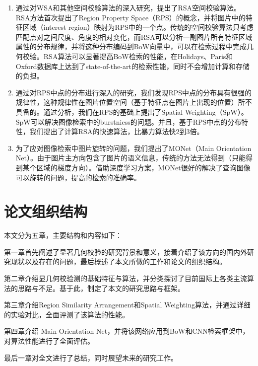\begin{enumerate}
\item  通过对WSA和其他空间校验算法的深入研究，提出了RSA空间校验算法。RSA方法首次提出了Region Property Space（RPS）的概念，并将图片中的特征区域（interest region）映射为RPS中的一个点。传统的空间校验算法只考虑匹配点对之间尺度、角度的相对变化，而RSA可以分析一副图片所有特征区域属性的分布规律，并将这种分布编码到BoW向量中，可以在检索过程中完成几何校验。RSA算法可以显著提高BoW检索的性能，在Holidays、Paris和Oxford数据库上达到了state-of-the-art的检索性能，同时不会增加计算和存储的负担。
\item  通过对RPS中点的分布进行深入的研究，我们发现RPS中点的分布具有很强的规律性，这种规律性在图片位置空间（基于特征点在图片上出现的位置）所不具备的。通过分析，我们在RPS的基础上提出了Spatial Weighting（SpW）。SpW可以解决图像检索中的burstniess\cite{jegou2009burstiness}的问题。并且，基于RPS中点的分布特性，我们提出了计算RSA的快速算法，比暴力算法快2到3倍。
\item 为了应对图像检索中图片旋转的问题，我们提出了MONet（Main Orientation Net）。由于图片主方向包含了图片的语义信息，传统的方法无法得到（只能得到某个区域的梯度方向）。借助深度学习方案，MONet很好的解决了查询图像可以旋转的问题，提高的检索的准确率。
\end{enumerate}

\section{论文组织结构}
本文分为五章，主要结构和内容如下：

第一章首先阐述了显著几何校验的研究背景和意义，接着介绍了该方向的国内外研究现状以及存在的问题，最后概述了本文所做的工作和论文的组织结构。

第二章介绍显几何校验测的基础特征与算法，并分类探讨了目前国际上各类主流算法的思路与不足。基于此，制定了本文的研究思路与框架。

第三章介绍Region Similarity Arrangement和Spatial Weighting算法，并通过详细的实验对比，全面评测了该算法的性能。

第四章介绍 Main Orientation Net，并将该网络应用到BoW和CNN检索框架中，对算法性能进行了全面评估。

最后一章对全文进行了总结，同时展望未来的研究工作。
